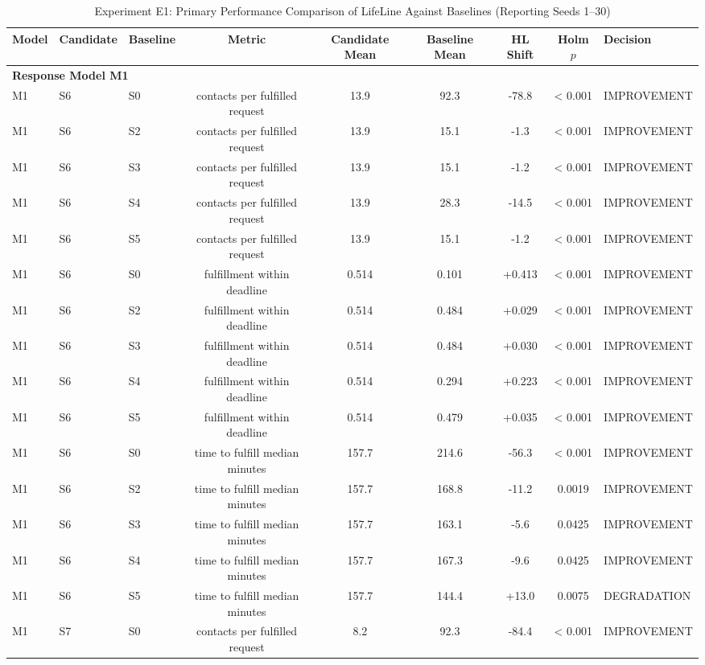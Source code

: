 \begin{table}[t]
\centering
\small
\caption{Experiment E1: Primary Performance Comparison of LifeLine Against Baselines (Reporting Seeds 1--30)}
\label{tab:e1_main_results}
\begin{tabular}{lllcccccl}
\toprule
Model & Candidate & Baseline & Metric & Candidate Mean & Baseline Mean & HL Shift & Holm $p$ & Decision \\
\midrule
\multicolumn{9}{l}{\textbf{Response Model M1}} \\
\midrule
M1 & S6 & S0 & contacts per fulfilled request & 13.9 & 92.3 & -78.8 & < 0.001 & IMPROVEMENT \\
M1 & S6 & S2 & contacts per fulfilled request & 13.9 & 15.1 & -1.3 & < 0.001 & IMPROVEMENT \\
M1 & S6 & S3 & contacts per fulfilled request & 13.9 & 15.1 & -1.2 & < 0.001 & IMPROVEMENT \\
M1 & S6 & S4 & contacts per fulfilled request & 13.9 & 28.3 & -14.5 & < 0.001 & IMPROVEMENT \\
M1 & S6 & S5 & contacts per fulfilled request & 13.9 & 15.1 & -1.2 & < 0.001 & IMPROVEMENT \\
M1 & S6 & S0 & fulfillment within deadline & 0.514 & 0.101 & +0.413 & < 0.001 & IMPROVEMENT \\
M1 & S6 & S2 & fulfillment within deadline & 0.514 & 0.484 & +0.029 & < 0.001 & IMPROVEMENT \\
M1 & S6 & S3 & fulfillment within deadline & 0.514 & 0.484 & +0.030 & < 0.001 & IMPROVEMENT \\
M1 & S6 & S4 & fulfillment within deadline & 0.514 & 0.294 & +0.223 & < 0.001 & IMPROVEMENT \\
M1 & S6 & S5 & fulfillment within deadline & 0.514 & 0.479 & +0.035 & < 0.001 & IMPROVEMENT \\
M1 & S6 & S0 & time to fulfill median minutes & 157.7 & 214.6 & -56.3 & < 0.001 & IMPROVEMENT \\
M1 & S6 & S2 & time to fulfill median minutes & 157.7 & 168.8 & -11.2 & 0.0019 & IMPROVEMENT \\
M1 & S6 & S3 & time to fulfill median minutes & 157.7 & 163.1 & -5.6 & 0.0425 & IMPROVEMENT \\
M1 & S6 & S4 & time to fulfill median minutes & 157.7 & 167.3 & -9.6 & 0.0425 & IMPROVEMENT \\
M1 & S6 & S5 & time to fulfill median minutes & 157.7 & 144.4 & +13.0 & 0.0075 & DEGRADATION \\
M1 & S7 & S0 & contacts per fulfilled request & 8.2 & 92.3 & -84.4 & < 0.001 & IMPROVEMENT \\

\end{tabular}
\end{table}
